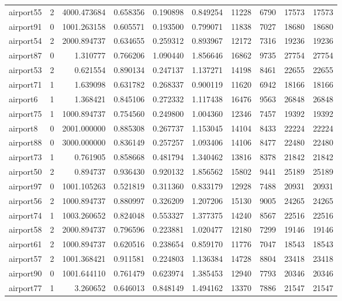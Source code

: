 \begin{longtable}{|l|r|r|r|r|r|r|r|r|r|}
airport55 & 2 & 4000.473684 & 0.658356 & 0.190898 & 0.849254 & 11228 & 6790 & 17573 & 17573 \\
airport91 & 0 & 1001.263158 & 0.605571 & 0.193500 & 0.799071 & 11838 & 7027 & 18680 & 18680 \\
airport54 & 2 & 2000.894737 & 0.634655 & 0.259312 & 0.893967 & 12172 & 7316 & 19236 & 19236 \\
airport87 & 0 & 1.310777 & 0.766206 & 1.090440 & 1.856646 & 16862 & 9735 & 27754 & 27754 \\
airport53 & 2 & 0.621554 & 0.890134 & 0.247137 & 1.137271 & 14198 & 8461 & 22655 & 22655 \\
airport71 & 1 & 1.639098 & 0.631782 & 0.268337 & 0.900119 & 11620 & 6942 & 18166 & 18166 \\
airport6 & 1 & 1.368421 & 0.845106 & 0.272332 & 1.117438 & 16476 & 9563 & 26848 & 26848 \\
airport75 & 1 & 1000.894737 & 0.754560 & 0.249800 & 1.004360 & 12346 & 7457 & 19392 & 19392 \\
airport8 & 0 & 2001.000000 & 0.885308 & 0.267737 & 1.153045 & 14104 & 8433 & 22224 & 22224 \\
airport88 & 0 & 3000.000000 & 0.836149 & 0.257257 & 1.093406 & 14106 & 8477 & 22480 & 22480 \\
airport73 & 1 & 0.761905 & 0.858668 & 0.481794 & 1.340462 & 13816 & 8378 & 21842 & 21842 \\
airport50 & 2 & 0.894737 & 0.936430 & 0.920132 & 1.856562 & 15802 & 9441 & 25189 & 25189 \\
airport97 & 0 & 1001.105263 & 0.521819 & 0.311360 & 0.833179 & 12928 & 7488 & 20931 & 20931 \\
airport56 & 2 & 1000.894737 & 0.880997 & 0.326209 & 1.207206 & 15130 & 9005 & 24265 & 24265 \\
airport74 & 1 & 1003.260652 & 0.824048 & 0.553327 & 1.377375 & 14240 & 8567 & 22516 & 22516 \\
airport58 & 2 & 2000.894737 & 0.796596 & 0.223881 & 1.020477 & 12180 & 7299 & 19146 & 19146 \\
airport61 & 2 & 1000.894737 & 0.620516 & 0.238654 & 0.859170 & 11776 & 7047 & 18543 & 18543 \\
airport57 & 2 & 1001.368421 & 0.911581 & 0.224803 & 1.136384 & 14728 & 8804 & 23418 & 23418 \\
airport90 & 0 & 1001.644110 & 0.761479 & 0.623974 & 1.385453 & 12940 & 7793 & 20346 & 20346 \\
airport77 & 1 & 3.260652 & 0.646013 & 0.848149 & 1.494162 & 13370 & 7886 & 21547 & 21547 \\

\end{longtable}
